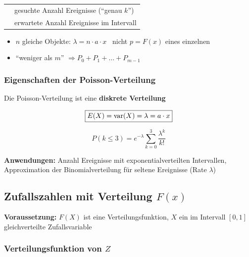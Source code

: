 \vspace{0.2cm}

\begin{tabular}{ll}
	\cgn{$k$}		& gesuchte Anzahl Ereignisse (``genau $k$'') \\
	\cbl{$\lambda$}	& erwartete Anzahl Ereignisse im Intervall
\end{tabular}

\begin{itemize}
	\item $n$ gleiche Objekte: $\lambda = n \cdot a \cdot x$ \textrightarrow\ nicht $p = F(x)$ eines einzelnen
	\item ``weniger als $m$'' $\Rightarrow P_0 + P_1 + \dots + P_{m-1}$
\end{itemize}


\subsubsection{Eigenschaften der Poisson-Verteilung}
\label{sec:poisson-eigenschaften}

Die Poisson-Verteilung ist eine \textbf{diskrete Verteilung}

\vspace{0.2cm}

$$ \boxed{ E(X) = \mathrm{var}(X) = \lambda = a \cdot x } $$

\vspace{0.2cm}

$$ \boxed{ P(k \leq 3) = e^{-\lambda} \sum\limits_{k=0}^3 \frac{\lambda^k}{k!} } $$


\vspace{0.15cm}
\textbf{Anwendungen:} Anzahl Ereignisse mit exponentialverteilten Intervallen, Approximation der Binomialverteilung für seltene Ereignisse (Rate $\lambda$)


\subsection[Zufallszahlen mit Verteilung F(x)]{Zufallszahlen mit Verteilung $F(x)$}

\textbf{Voraussetzung:} $F(X)$ ist eine Verteilungsfunktion, $X$ ein im Intervall $[0,1]$ gleichverteilte Zufallsvariable


\subsubsection{Verteilungsfunktion von $Z$}

